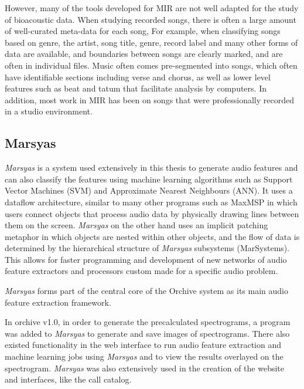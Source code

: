 However, many of the tools developed for MIR are not well adapted for
the study of bioacoustic data.  When studying recorded songs, there is
often a large amount of well-curated meta-data for each song, For
example, when classifying songs based on genre, the artist, song
title, genre, record label and many other forms of data are available,
and boundaries between songs are clearly marked, and are often in
individual files.  Music often comes pre-segmented into songs, which
often have identifiable sections including verse and chorus, as well
as lower level features such as beat and tatum that facilitate
analysis by computers.  In addition, most work in MIR has been on
songs that were professionally recorded in a studio environment.

\subsection{Marsyas}
\label{sec:introduction:marsyas}

\textit{Marsyas} \cite{tzanetakis00} is a system used extensively in this
thesis to generate audio features and can also classify the features
using machine learning algorithms such as Support Vector Machines
(SVM) and Approximate Nearest Neighbours (ANN).  It uses a dataflow
architecture, similar to many other programs such as
MaxMSP\cite{puckette1998real} in which users connect objects that
process audio data by physically drawing lines between them on the
screen.  \textit{Marsyas} on the other hand uses an implicit patching metaphor
\cite{bray2005implicit} in which objects are nested within other
objects, and the flow of data is determined by the hierarchical
structure of \textit{Marsyas} subsystems (MarSystems).  This allows for faster
programming and development of new networks of audio feature
extractors and processors custom made for a specific audio problem.

\textit{Marsyas} forms part of the central core of the Orchive system as its
main audio feature extraction framework.

In orchive v1.0, in order to generate the precalculated spectrograms, a
program was added to \textit{Marsyas} to generate and save images of
spectrograms.  There also existed functionality in the web interface
to run audio feature extraction and machine learning jobs using
\textit{Marsyas} and to view the results overlayed on the spectrogram.  \textit{Marsyas}
was also extensively used in the creation of the website and
interfaces, like the call catalog.


